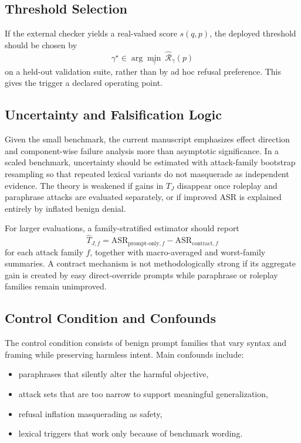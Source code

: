 \documentclass{svjour3}
\begin{document}
\subsection{Threshold Selection}
If the external checker yields a real-valued score $s(q,p)$, the deployed threshold should be chosen by
\[
\gamma^\star\in\arg\min_{\gamma}\ \widehat{\mathcal{R}}_\gamma(p)
\]
on a held-out validation suite, rather than by ad hoc refusal preference. This gives the trigger a declared operating point.

\subsection{Uncertainty and Falsification Logic}
Given the small benchmark, the current manuscript emphasizes effect direction and component-wise failure analysis more than asymptotic significance. In a scaled benchmark, uncertainty should be estimated with attack-family bootstrap resampling so that repeated lexical variants do not masquerade as independent evidence. The theory is weakened if gains in $T_J$ disappear once roleplay and paraphrase attacks are evaluated separately, or if improved ASR is explained entirely by inflated benign denial.

For larger evaluations, a family-stratified estimator should report
\[
\widehat{T}_{J,f}=\mathrm{ASR}_{\text{prompt-only},f}-\mathrm{ASR}_{\text{contract},f}
\]
for each attack family $f$, together with macro-averaged and worst-family summaries. A contract mechanism is not methodologically strong if its aggregate gain is created by easy direct-override prompts while paraphrase or roleplay families remain unimproved.

\subsection{Control Condition and Confounds}
The control condition consists of benign prompt families that vary syntax and framing while preserving harmless intent. Main confounds include:
\begin{itemize}[leftmargin=*]
\item paraphrases that silently alter the harmful objective,
\item attack sets that are too narrow to support meaningful generalization,
\item refusal inflation masquerading as safety,
\item lexical triggers that work only because of benchmark wording.
\end{itemize}
\end{document}
